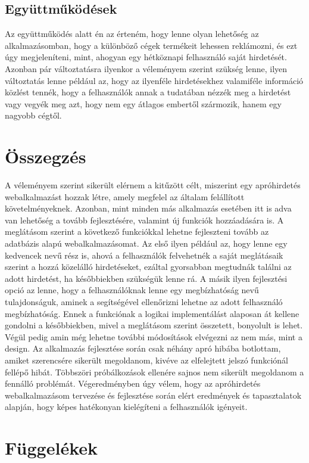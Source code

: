 \documentclass[]{thesis-ekf}
\theoremstyle{definition}
\theoremstyle{remark}
\begin{document}
		 \section{Együttműködések}
			Az együttműködés alatt én az érteném, hogy lenne olyan lehetőség az alkalmazásomban, hogy a különböző cégek termékeit lehessen reklámozni, és ezt úgy megjeleníteni, mint, ahogyan egy hétköznapi felhasználó saját hirdetését. Azonban pár változtatásra ilyenkor a véleményem szerint szükség lenne, ilyen változtatás lenne például az, hogy az ilyenféle hirdetésekhez valamiféle információ közlést tennék, hogy a felhasználók annak a tudatában nézzék meg a hirdetést vagy vegyék meg azt, hogy nem egy átlagos embertől szármozik, hanem egy nagyobb cégtől.
	\chapter*{Összegzés}
		A véleményem szerint sikerült elérnem a kitűzött célt, miszerint egy apróhirdetés webalkalmazást hozzak létre, amely megfelel az általam felállított követelményeknek. Azonban, mint minden más alkalmazás esetében itt is adva van lehetőség a tovább fejlesztésére, valamint új funkciók hozzáadására is. A meglátásom szerint a következő funkciókkal lehetne fejleszteni tovább az adatbázis alapú webalkalmazásomat. Az első ilyen például az, hogy lenne egy kedvencek nevű rész is, ahová a felhasználók felvehetnék a saját meglátásaik szerint a hozzá közelálló hirdetéseket, ezáltal gyorsabban megtudnák találni az adott hirdetést, ha későbbiekben szükségük lenne rá. A másik ilyen fejlesztési opció az lenne, hogy a felhasználóknak lenne egy megbízhatóság nevű tulajdonságuk, aminek a segítségével ellenőrizni lehetne az adott felhasználó megbízhatóság. Ennek a funkciónak a logikai implementálást alaposan át kellene gondolni a későbbiekben, mivel a meglátásom szerint összetett, bonyolult is lehet. Végül pedig amin még lehetne további módosítások elvégezni az nem más, mint a design. Az alkalmazás fejlesztése során csak néhány apró hibába botlottam, amiket szerencsére sikerült megoldanom, kivéve az elfelejtett jelszó funkciónál fellépő hibát. Többszöri próbálkozások ellenére sajnos nem sikerült megoldanom a fennálló problémát. Végeredményben úgy vélem, hogy az apróhirdetés webalkalmazásom tervezése és fejlesztése során elért eredmények és tapasztalatok alapján, hogy képes hatékonyan kielégíteni a felhasználók igényeit.
		
	\chapter*{Függelékek}\label{ch-fugg}
\end{document}

